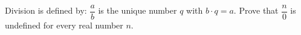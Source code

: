 Division is defined by: $\dfrac ab$ is the unique number $q$ with $b\cdot q=a$. Prove that $\dfrac n0$ is undefined for every real number $n$.

